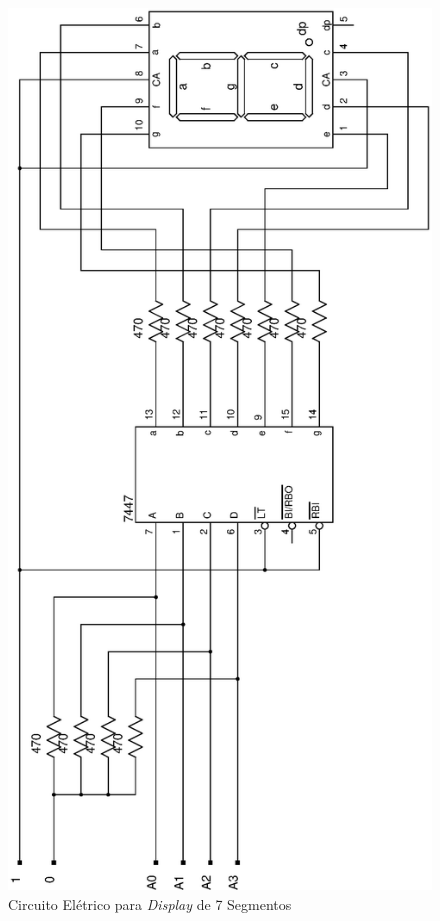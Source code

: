 \documentclass{article}
\begin{document}
\begin{figure}
    \centering{}
    \includegraphics[width=\textwidth]{ci7447.ps}
    \caption{Circuito Elétrico para \emph{Display} de 7 Segmentos}
    \label{fig:ci7447}
\end{figure}
\end{document}
